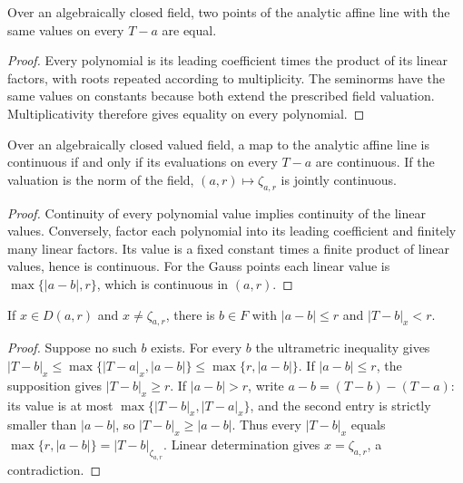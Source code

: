 \begin{lemma}\label{lem:fc-linear-determination}
\leanok
Over an algebraically closed field, two points of the analytic affine line
with the same values on every $T-a$ are equal.
\end{lemma}

\begin{proof}
Every polynomial is its leading coefficient times the product of its linear
factors, with roots repeated according to multiplicity. The seminorms have
the same values on constants because both extend the prescribed field
valuation. Multiplicativity therefore gives equality on every polynomial.
\end{proof}

\begin{lemma}\label{lem:fc-linear-topology}
\leanok
Over an algebraically closed valued field, a map to the analytic affine line
is continuous if and only if its evaluations on every $T-a$ are continuous.
If the valuation is the norm of the field, $(a,r)\mapsto\zeta_{a,r}$ is jointly
continuous.
\end{lemma}

\begin{proof}
Continuity of every polynomial value implies continuity of the linear values.
Conversely, factor each polynomial into its leading coefficient and finitely
many linear factors. Its value is a fixed constant times a finite product of
linear values, hence is continuous. For the Gauss points each linear value is
$\max\{|a-b|,r\}$, which is continuous in $(a,r)$.
\end{proof}

\begin{lemma}\label{lem:fc-strict-residue-disc}
\leanok
If $x\in D(a,r)$ and $x\ne\zeta_{a,r}$, there is $b\in F$ with
$|a-b|\le r$ and $|T-b|_x<r$.
\end{lemma}

\begin{proof}
Suppose no such $b$ exists. For every $b$ the ultrametric inequality gives
$|T-b|_x\le\max\{|T-a|_x,|a-b|\}\le\max\{r,|a-b|\}$.
If $|a-b|\le r$, the supposition gives $|T-b|_x\ge r$.
If $|a-b|>r$, write $a-b=(T-b)-(T-a)$: its value is at most
$\max\{|T-b|_x,|T-a|_x\}$, and the second entry is strictly smaller
than $|a-b|$, so $|T-b|_x\ge|a-b|$. Thus every $|T-b|_x$ equals
$\max\{r,|a-b|\}=|T-b|_{\zeta_{a,r}}$. Linear determination gives
$x=\zeta_{a,r}$, a contradiction.
\end{proof}

